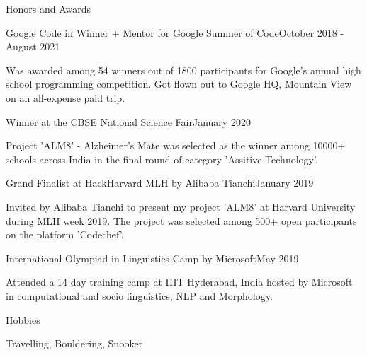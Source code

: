 \documentclass[
	a4paper, %
	11pt, %
]{resume} %
\begin{document}
\begin{rSection}{Honors and Awards}

	\begin{achSubsection}{Google Code in Winner + Mentor for Google Summer of Code}{October 2018 - August 2021}
		\item Was awarded among 54 winners out of 1800 participants for Google's annual high school programming competition. Got flown out to Google HQ, Mountain View on an all-expense paid trip.
	\end{achSubsection}


	\begin{achSubsection}{Winner at the CBSE National Science Fair}{January 2020}
		\item Project 'ALM8' - Alzheimer's Mate was selected as the winner among 10000+ schools across India in the final round of category 'Assitive Technology'.
	\end{achSubsection}


	\begin{achSubsection}{Grand Finalist at HackHarvard MLH by Alibaba Tianchi}{January 2019}
		\item Invited by Alibaba Tianchi to present my project 'ALM8' at Harvard University during MLH week 2019. The project was selected among 500+ open participants on the platform 'Codechef'.
	\end{achSubsection}


	\begin{achSubsection}{International Olympiad in Linguistics Camp by Microsoft}{May 2019}
		\item Attended a 14 day training camp at IIIT Hyderabad, India hosted by Microsoft in computational and socio linguistics, NLP and Morphology.
	\end{achSubsection}

\end{rSection}

\begin{rSection}{Hobbies}

	Travelling, Bouldering, Snooker


\end{rSection}
\end{document}
